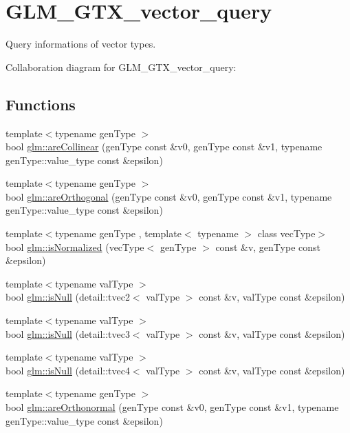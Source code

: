 \hypertarget{group__gtx__vector__query}{}\section{G\+L\+M\+\_\+\+G\+T\+X\+\_\+vector\+\_\+query}
\label{group__gtx__vector__query}


Query informations of vector types.  


Collaboration diagram for G\+L\+M\+\_\+\+G\+T\+X\+\_\+vector\+\_\+query\+:
\subsection*{Functions}
\begin{DoxyCompactItemize}
\item 
{\footnotesize template$<$typename gen\+Type $>$ }\\bool \hyperlink{group__gtx__vector__query_ga516c25a0d2c46c64fb5afca5eb24daab}{glm\+::are\+Collinear} (gen\+Type const \&v0, gen\+Type const \&v1, typename gen\+Type\+::value\+\_\+type const \&epsilon)
\item 
{\footnotesize template$<$typename gen\+Type $>$ }\\bool \hyperlink{group__gtx__vector__query_ga0cba4a48074a8b8b8474538385a709e7}{glm\+::are\+Orthogonal} (gen\+Type const \&v0, gen\+Type const \&v1, typename gen\+Type\+::value\+\_\+type const \&epsilon)
\item 
{\footnotesize template$<$typename gen\+Type , template$<$ typename $>$ class vec\+Type$>$ }\\bool \hyperlink{group__gtx__vector__query_ga462311ef54b0201f227b927bdcbf2c6e}{glm\+::is\+Normalized} (vec\+Type$<$ gen\+Type $>$ const \&v, gen\+Type const \&epsilon)
\item 
{\footnotesize template$<$typename val\+Type $>$ }\\bool \hyperlink{group__gtx__vector__query_ga891a13a3a161b48496d478cadc53c5cf}{glm\+::is\+Null} (detail\+::tvec2$<$ val\+Type $>$ const \&v, val\+Type const \&epsilon)
\item 
{\footnotesize template$<$typename val\+Type $>$ }\\bool \hyperlink{group__gtx__vector__query_ga4be073840d3219da9caa30bbfca34140}{glm\+::is\+Null} (detail\+::tvec3$<$ val\+Type $>$ const \&v, val\+Type const \&epsilon)
\item 
{\footnotesize template$<$typename val\+Type $>$ }\\bool \hyperlink{group__gtx__vector__query_gaeaf0cba105a973ea70c74c308ae7954f}{glm\+::is\+Null} (detail\+::tvec4$<$ val\+Type $>$ const \&v, val\+Type const \&epsilon)
\item 
{\footnotesize template$<$typename gen\+Type $>$ }\\bool \hyperlink{group__gtx__vector__query_gab6b9a4e79fb7b34e8817ae9c870eb06e}{glm\+::are\+Orthonormal} (gen\+Type const \&v0, gen\+Type const \&v1, typename gen\+Type\+::value\+\_\+type const \&epsilon)
\end{DoxyCompactItemize}


